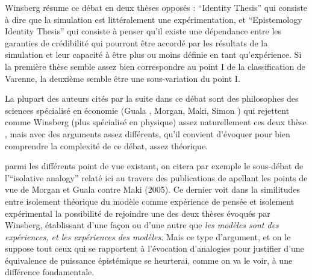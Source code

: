 Winsberg résume ce débat en deux thèses opposés : \foreignquote{english}{Identity Thesis} qui consiste à dire que la simulation est littéralement une expérimentation, et \foreignquote{english}{Epistemology Identity Thesis} qui consiste à penser qu'il existe une dépendance entre les garanties de crédibilité qui pourront être accordé par les résultats de la simulation et leur capacité à être plus ou moins définie en tant qu'expérience. Si la première thèse semble assez bien correspondre au point I de la classification de Varenne, la deuxième semble être une sous-variation du point I.

La plupart des auteurs cités par la suite dans ce débat sont des philosophes des sciences spécialisé en économie (Guala , Morgan, Maki, Simon ) qui rejettent comme Winsberg (plus spécialisé en physique) assez naturellement ces deux thèse \autocite{Winsberg2009}, mais avec des arguments assez différents, qu'il convient d'évoquer pour bien comprendre la complexité de ce débat, assez théorique. 


parmi les différents point de vue existant, on citera par exemple le sous-débat de l'\foreignquote{english}{isolative analogy} relaté ici au travers des publications de \textcite{Phan2008, Phan2010} apellant les points de vue de Morgan et Guala contre Maki (2005). Ce dernier voit dans la similitudes entre isolement théorique du modèle comme expérience de pensée et isolement expérimental  la possibilité de rejoindre une des deux thèses évoqués par Winsberg, établissant d'une façon ou d'une autre que \textit{les modèles sont des expériences, et les expériences des modèles}. Mais ce type d'argument, et on le suppose tout ceux qui se rapportent à l'évocation d'analogies pour justifier d'une équivalence de puissance épistémique se heurterai, comme on va le voir, à une différence fondamentale.

